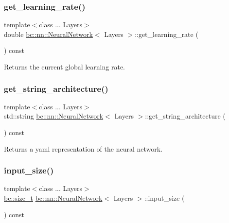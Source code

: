 \subsubsection{\texorpdfstring{get\+\_\+learning\+\_\+rate()}{get\_learning\_rate()}}
{\footnotesize\ttfamily template$<$class ... Layers$>$ \\
double \hyperlink{structbc_1_1nn_1_1NeuralNetwork}{bc\+::nn\+::\+Neural\+Network}$<$ Layers $>$\+::get\+\_\+learning\+\_\+rate (\begin{DoxyParamCaption}{ }\end{DoxyParamCaption}) const\hspace{0.3cm}{\ttfamily [inline]}}



Returns the current global learning rate. 

\mbox{\label{structbc_1_1nn_1_1NeuralNetwork_ae5382a83cc99a5e0ff5e8107b7cca8c3}} 
\subsubsection{\texorpdfstring{get\+\_\+string\+\_\+architecture()}{get\_string\_architecture()}}
{\footnotesize\ttfamily template$<$class ... Layers$>$ \\
std\+::string \hyperlink{structbc_1_1nn_1_1NeuralNetwork}{bc\+::nn\+::\+Neural\+Network}$<$ Layers $>$\+::get\+\_\+string\+\_\+architecture (\begin{DoxyParamCaption}{ }\end{DoxyParamCaption}) const\hspace{0.3cm}{\ttfamily [inline]}}



Returns a yaml representation of the neural network. 

\mbox{\label{structbc_1_1nn_1_1NeuralNetwork_aaefe5c1d79e9ba9ecae822c50bb8e31d}} 
\subsubsection{\texorpdfstring{input\+\_\+size()}{input\_size()}}
{\footnotesize\ttfamily template$<$class ... Layers$>$ \\
\hyperlink{namespacebc_aaf8e3fbf99b04b1b57c4f80c6f55d3c5}{bc\+::size\+\_\+t} \hyperlink{structbc_1_1nn_1_1NeuralNetwork}{bc\+::nn\+::\+Neural\+Network}$<$ Layers $>$\+::input\+\_\+size (\begin{DoxyParamCaption}{ }\end{DoxyParamCaption}) const\hspace{0.3cm}{\ttfamily [inline]}}



